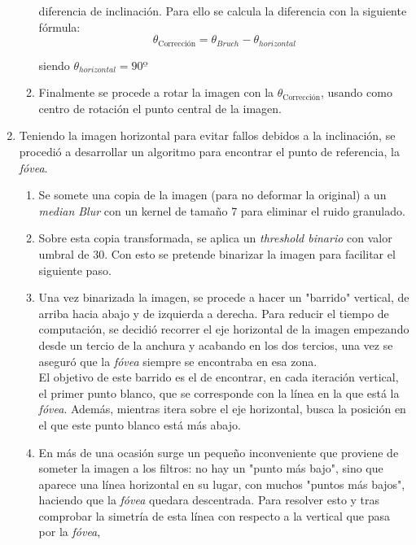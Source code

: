 \begin{enumerate}
\begin{enumerate}[label*=\arabic*.]
    diferencia de inclinación. Para ello se calcula la diferencia con
    la siguiente fórmula:
    \begin{equation*}
      \theta_\text{Corrección} = \theta_{Bruch} - \theta_{horizontal} 
    \end{equation*}
    \begin{center}
      siendo $\theta_{horizontal} = 90º$
    \end{center}
  \item Finalmente se procede a rotar la imagen con la
    $\theta_{\text{Corrección}}$, usando como centro de rotación el
    punto central de la imagen.
  \end{enumerate}
\item Teniendo la imagen horizontal para evitar fallos debidos a la 
  inclinación, se procedió a desarrollar un algoritmo para encontrar 
  el punto de referencia, la \emph{fóvea}.
  \begin{enumerate}[label*=\arabic*.] 
  \item Se somete una copia de la imagen (para no deformar la original)
    a un \emph{median Blur} con un kernel de tamaño 7 para eliminar 
    el ruido granulado.
  \item Sobre esta copia transformada, se aplica un 
    \emph{threshold binario} con valor umbral de 30. Con esto se 
    pretende binarizar la imagen para facilitar el siguiente paso.
  \item Una vez binarizada la imagen, se procede a hacer un "barrido" 
    vertical, de arriba hacia abajo y de izquierda a derecha. Para 
    reducir el tiempo de computación, se decidió recorrer el eje 
    horizontal de la imagen empezando desde un tercio de la anchura y 
    acabando en los dos tercios, una vez se aseguró que la \emph{fóvea} 
    siempre se encontraba en esa zona. \\
    El objetivo de este barrido es el de encontrar, en cada iteración 
    vertical, el primer punto blanco, que se corresponde con la línea 
    en la que está la \emph{fóvea}. Además, mientras itera sobre el 
    eje horizontal, busca la posición en el que este punto blanco 
    está más abajo.
  \item En más de una ocasión surge un pequeño inconveniente que 
    proviene de someter la imagen a los filtros: no hay un "punto
    más bajo", sino que aparece una línea horizontal en su lugar, 
    con muchos "puntos más bajos", haciendo que la \emph{fóvea} quedara 
    descentrada. Para resolver esto y tras comprobar la simetría de 
    esta línea con respecto a la vertical que pasa por la \emph{fóvea},

\end{enumerate}
\end{enumerate}
